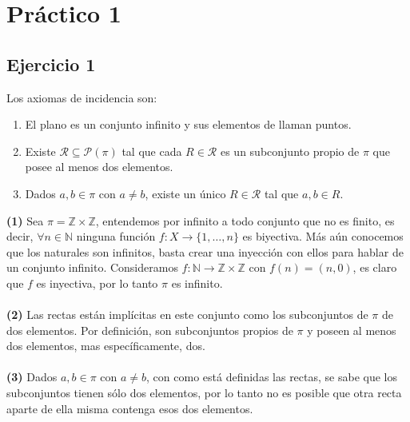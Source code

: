\documentclass[a4paper]{article}
\begin{document}
\section{Práctico 1}
\subsection{Ejercicio 1}
Los axiomas de incidencia son:
\begin{enumerate}
    \item El plano es un conjunto infinito y sus elementos de llaman puntos.
    \item Existe $\mathcal{R} \subseteq \mathcal{P} (\pi)$ tal que cada $R \in \mathcal{R}$ es un subconjunto propio de $\pi$ que posee al menos dos elementos.
    \item Dados $a,b \in \pi$ con $a \neq b$, existe un único $R \in \mathcal{R}$ tal que $a,b \in R$.  
\end{enumerate}
\textbf{(1)} Sea $\pi = \mathbb{Z} \times \mathbb{Z}$, entendemos por infinito a todo conjunto que no es finito, es decir, $\forall n \in \mathbb{N}$ ninguna función $f:X\rightarrow \{1,\dots ,n\}$ es biyectiva. Más aún conocemos que los naturales son infinitos, basta crear una inyección con ellos para hablar de un conjunto infinito. Consideramos $f:\mathbb{N}\rightarrow\mathbb{Z} \times \mathbb{Z}$ con $f(n)=(n,0)$, es claro que $f$ es inyectiva, por lo tanto $\pi$ es infinito.\\\\
\textbf{(2)} Las rectas están implícitas en este conjunto como los subconjuntos de $\pi$ de dos elementos. Por definición, son subconjuntos propios de $\pi$ y poseen al menos dos elementos, mas específicamente, dos.\\\\
\textbf{(3)} Dados $a,b \in \pi$ con $a\neq b$, con como está definidas las rectas, se sabe que los subconjuntos tienen sólo dos elementos, por lo tanto no es posible que otra recta aparte de ella misma contenga esos dos elementos.
\end{document}
